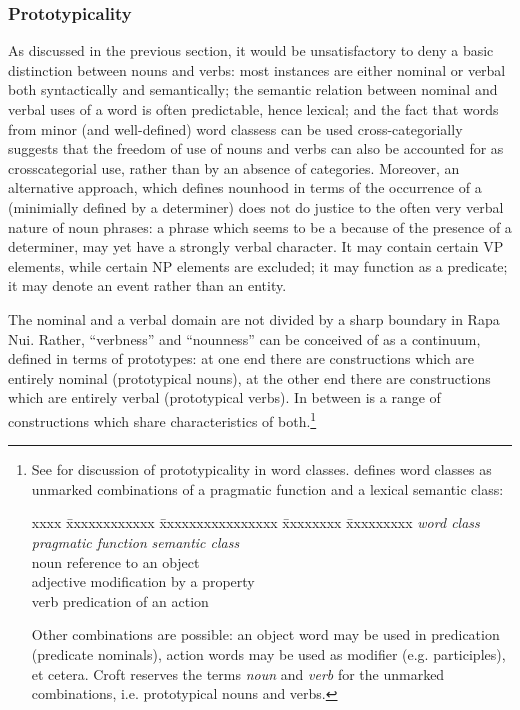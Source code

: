 \subsubsection[Prototypicality]{Prototypicality}\label{sec:3.2.1.2}
As discussed in the previous section, it would be unsatisfactory to deny a basic distinction between nouns and verbs: most instances are either nominal or verbal both syntactically and semantically; the semantic relation between nominal and verbal uses of a word is often predictable, hence lexical; and the fact that words from minor (and well-defined) word classess can be used cross-categorially suggests that the freedom of use of nouns and verbs can also be accounted for as crosscategorial use, rather than by an absence of categories. Moreover, an alternative approach, which defines nounhood in terms of the occurrence of a  (minimially defined by a determiner) does not do justice to the often very verbal nature of noun phrases: a phrase which seems to be a  because of the presence of a determiner, may yet have a strongly verbal character. It may contain certain VP elements, while certain NP elements are excluded; it may function as a predicate; it may denote an event rather than an entity. 

\largerpage
The nominal and a verbal domain are not divided by a sharp boundary in Rapa Nui. Rather, “verbness” and “nounness” can be conceived of as a continuum, defined in terms of prototypes: at one end there are constructions which are entirely nominal (prototypical nouns), at the other end there are constructions which are entirely verbal (prototypical verbs). In between is a range of constructions which share characteristics of both.\footnote{\label{fn:95}See \citet[34–38]{Payne1997} for discussion of prototypicality in word classes. \citet{Croft2000} defines word classes as unmarked combinations of a pragmatic function and a lexical semantic class: 
\begin{tabbing}
xxxx \= xxxxxxxxxxxx \= xxxxxxxxxxxxxxxx \= xxxxxxxx \= xxxxxxxxx \kill
\> \textit{word class} \> \textit{pragmatic function} \> \>  \textit{semantic class}\\
\> noun \> reference \> to an \> object\\
\> adjective \> modification \> by a\>  property\\
\> verb \> predication \> of an\>  action
\end{tabbing}
Other combinations are possible: an object word may be used in predication (predicate nominals), action words may be used as modifier (e.g. participles), et cetera. Croft reserves the terms \textit{noun} and \textit{verb} for the unmarked combinations, i.e. prototypical nouns and verbs.} 

